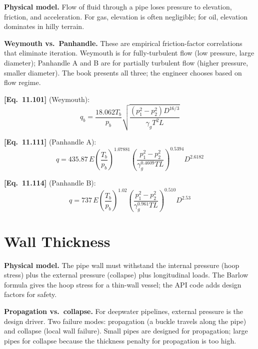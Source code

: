 \documentclass[11pt,a4paper,openany]{book}
\newcommand{\eqrefbook}[1]{\textcolor{blue!60!black}{\textbf{[Eq.~#1]}}}
\begin{document}
\begin{theory}
\textbf{Physical model.} Flow of fluid through a pipe loses pressure
to elevation, friction, and acceleration. For gas, elevation is often
negligible; for oil, elevation dominates in hilly terrain.

\textbf{Weymouth vs.\ Panhandle.} These are empirical friction-factor
correlations that eliminate iteration. Weymouth is for fully-turbulent
flow (low pressure, large diameter); Panhandle A and B are for
partially turbulent flow (higher pressure, smaller diameter). The
book presents all three; the engineer chooses based on flow regime.
\end{theory}

\eqrefbook{11.101} (Weymouth):
\begin{equation}
  q_b = \frac{18.062 T_b}{p_b}
  \sqrt{\frac{(p_1^2 - p_2^2) D^{16/3}}{\gamma_g T^2 L}}
\end{equation}

\eqrefbook{11.111} (Panhandle A):
\begin{equation}
  q = 435.87\,E\left(\frac{T_b}{p_b}\right)^{1.07881}
  \left(\frac{p_1^2 - p_2^2}{\gamma_g^{0.4609} T L}\right)^{0.5394}
  D^{2.6182}
\end{equation}

\eqrefbook{11.114} (Panhandle B):
\begin{equation}
  q = 737\,E\left(\frac{T_b}{p_b}\right)^{1.02}
  \left(\frac{p_1^2 - p_2^2}{\gamma_g^{0.961} T L}\right)^{0.510}
  D^{2.53}
\end{equation}

\section{Wall Thickness}

\begin{theory}
\textbf{Physical model.} The pipe wall must withstand the internal
pressure (hoop stress) plus the external pressure (collapse) plus
longitudinal loads. The Barlow formula gives the hoop stress for a
thin-wall vessel; the API code adds design factors for safety.

\textbf{Propagation vs.\ collapse.} For deepwater pipelines, external
pressure is the design driver. Two failure modes: propagation (a
buckle travels along the pipe) and collapse (local wall failure).
Small pipes are designed for propagation; large pipes for collapse
because the thickness penalty for propagation is too high.
\end{theory}
\end{document}

